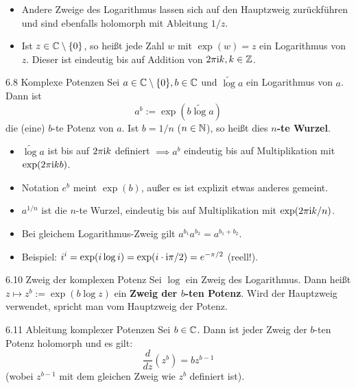 \begin{tcolorbox}[colback=white, colframe=black!70, title={Bemerkungen 6.6 \& 6.7}]
\begin{itemize}
    \item[6.6] Andere Zweige des Logarithmus lassen sich auf den Hauptzweig zurückführen und sind ebenfalls holomorph mit Ableitung $1/z$.
    \item[6.7] Ist $z \in \mathbb{C} \setminus \{0\}$, so heißt jede Zahl $w$ mit $\exp(w) = z$ ein Logarithmus von $z$. Dieser ist eindeutig bis auf Addition von $2\pi\mathrm{i} k, k \in \mathbb{Z}$.
\end{itemize}
\end{tcolorbox}

\begin{defi}{6.8 Komplexe Potenzen}
Sei $a \in \mathbb{C} \setminus \{0\}, b \in \mathbb{C}$ und $\widetilde{\log} a$ ein Logarithmus von $a$. Dann ist
\[
    a^b := \exp(b \widetilde{\log} a)
\]
die (eine) $b$-te Potenz von $a$. Ist $b = 1/n$ ($n \in \mathbb{N}$), so heißt dies \textbf{$n$-te Wurzel}.
\end{defi}

\begin{tcolorbox}[colback=white, colframe=black!70, title={Bemerkung 6.9: Eigenschaften der Potenz}]
\begin{itemize}
    \item[i)] $\widetilde{\log} a$ ist bis auf $2\pi\mathrm{i} k$ definiert $\implies a^b$ eindeutig bis auf Multiplikation mit $\exp(2\pi\mathrm{i} k b)$.
    \item[ii)] Notation $e^b$ meint $\exp(b)$, außer es ist explizit etwas anderes gemeint.
    \item[iii)] $a^{1/n}$ ist die $n$-te Wurzel, eindeutig bis auf Multiplikation mit $\exp(2\pi\mathrm{i} k / n)$.
    \item[iv)] Bei gleichem Logarithmus-Zweig gilt $a^{b_1} a^{b_2} = a^{b_1+b_2}$.
    \item[v)] Beispiel: $i^i = \exp(i \log i) = \exp(i \cdot \mathrm{i}\pi/2) = e^{-\pi/2}$ (reell!).
\end{itemize}
\end{tcolorbox}

\begin{defi}{6.10 Zweig der komplexen Potenz}
Sei $\log$ ein Zweig des Logarithmus. Dann heißt $z \mapsto z^b := \exp(b \log z)$ ein \textbf{Zweig der $b$-ten Potenz}. Wird der Hauptzweig verwendet, spricht man vom Hauptzweig der Potenz.
\end{defi}

\begin{satz}{6.11 Ableitung komplexer Potenzen}
Sei $b \in \mathbb{C}$. Dann ist jeder Zweig der $b$-ten Potenz holomorph und es gilt:
\[
    \frac{d}{dz} (z^b) = b z^{b-1}
\]
(wobei $z^{b-1}$ mit dem gleichen Zweig wie $z^b$ definiert ist).
\end{satz}

